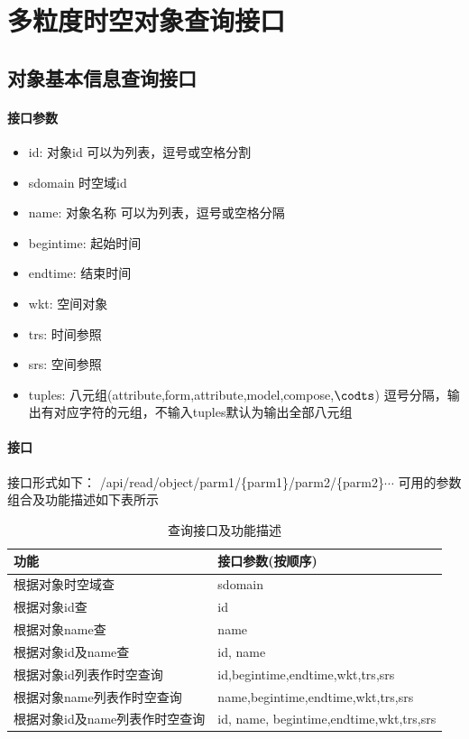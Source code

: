 \documentclass[UTF8, 12pt]{ctexart}
\begin{document}
\section{多粒度时空对象查询接口}
\subsection{对象基本信息查询接口}
	\paragraph{接口参数}
		\begin{itemize}
			\item id: 对象id 可以为列表，逗号或空格分割
			\item sdomain 时空域id
			\item name: 对象名称 可以为列表，逗号或空格分隔
			\item begintime: 起始时间
			\item endtime: 结束时间
			\item wkt: 空间对象
			\item trs: 时间参照
			\item srs: 空间参照
			\item tuples: 八元组(attribute,form,attribute,model,compose,$\codts$) 逗号分隔，输出有对应字符的元组，不输入tuples默认为输出全部八元组
		\end{itemize}
	\paragraph{接口}
		接口形式如下：
		\newline
		{\color{red}/api/read/object/parm1/\{parm1\}/parm2/\{parm2\}$\cdots$}
		可用的参数组合及功能描述如下表所示
		\begin{table}[H]
			\centering
			\caption{查询接口及功能描述}
			\begin{tabular}{|p{6cm}|p{8cm}|}
				\hline
				功能 & 接口参数(按顺序) \\
				\hline
				根据对象时空域查 & sdomain \\
				\hline
				根据对象id查 & id \\
				\hline
				根据对象name查 & name \\
				\hline
				根据对象id及name查 & id, name \\
				\hline
				根据对象id列表作时空查询 & id,begintime,endtime,wkt,trs,srs \\
				\hline
				根据对象name列表作时空查询 & name,begintime,endtime,wkt,trs,srs \\
				\hline
				根据对象id及name列表作时空查询 & id, name, begintime,endtime,wkt,trs,srs \\
				\hline
			\end{tabular}
		\end{table}
\end{document}

